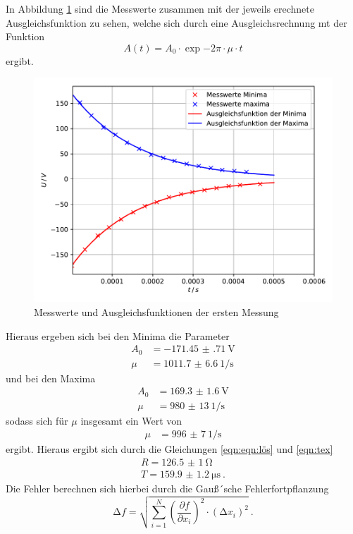 \noindent In Abbildung \ref{fig:plot1} sind die Messwerte zusammen mit der jeweils erechnete Ausgleichsfunktion
zu sehen, welche sich durch eine Ausgleichsrechnung mt der Funktion
\begin{equation}
  A(t)= A_0 \cdot \exp{-2\pi \cdot \mu \cdot t}
\end{equation}
ergibt.
\begin{figure}[H]
  \centering
  \includegraphics{plot1.pdf}
  \caption{Messwerte und Ausgleichsfunktionen der ersten Messung}
  \label{fig:plot1}
\end{figure}

\noindent Hieraus ergeben sich bei den Minima die Parameter
\begin{align*}
  A_0 &= \SI{-171.45(71)}{\volt} \\
  \mu&= \SI{1011.7(66)}{1\per\second}
\end{align*}
und bei den Maxima
\begin{align*}
  A_0 &= \SI{169.3(16)}{\volt} \\
  \mu&= \SI{980(13)}{1\per\second}
\end{align*}
sodass sich für $ \mu $ insgesamt ein Wert von
\begin{align*}
  \mu &= \SI{996(7)}{1\per\second}
\end{align*}
ergibt.
Hieraus ergibt sich durch die Gleichungen \ref{eqn:eqn:lös} und \ref{eqn:tex}
\begin{align*}
  R= \SI{126.5(10)}{\ohm} \\
  T= \SI{159.9(12)}{\micro\second} \: .
\end{align*}
Die Fehler berechnen sich hierbei durch die Gauß´sche Fehlerfortpflanzung
\begin{equation}
  \increment f = \sqrt{ \sum_{i=1}^N \left( \frac{\partial f}{\partial x_i}\right)^2
  \cdot (\increment x_i)^2  } \: .
  \label{eqn:gaus}
\end{equation}
